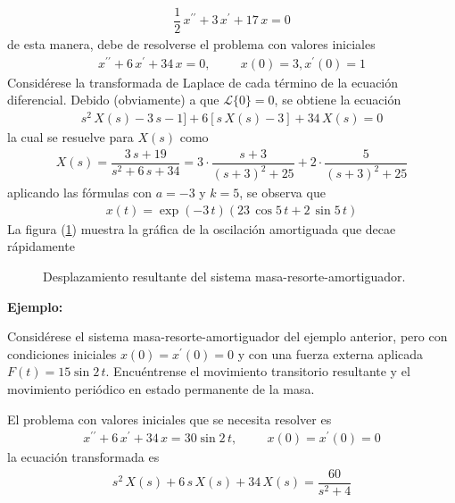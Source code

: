 \begin{align*}
\dfrac{1}{2} \, x^{\prime \prime} + 3 \, x^{\prime} + 17 \, x = 0
\end{align*}
de esta manera, debe de resolverse el problema con valores iniciales
\begin{align*}
x^{\prime \prime} + 6 \, x^{\prime} + 34 \, x = 0, \hspace{1cm} x(0) = 3, x^{\prime}(0) = 1
\end{align*}
Considérese la transformada de Laplace de cada término de la ecuación diferencial. Debido (obviamente) a que $\mathscr{L} \{ 0 \} = 0 $, se obtiene la ecuación
\begin{align*}
s^{2} \, X(s) - 3 \, s - 1] + 6 [s \, X(s) - 3] +  34 \, X(s) = 0
\end{align*}
la cual se resuelve para $X(s)$ como
\begin{align*}
X(s) = \dfrac{3 \, s + 19}{s^{2} + 6 \, s + 34} =  3 \cdot \dfrac{s + 3}{(s+3)^{2} + 25} + 2 \cdot \dfrac{5}{(s+3)^{2} + 25}
\end{align*}
aplicando las fórmulas con $a = -3$ y $k = 5$, se observa que
\begin{align*}
x(t) = \exp(-3 \, t) (23 \, \cos 5 \, t  + 2 \, \sin 5 \, t)
\end{align*}
La figura (\ref{fig:figura_07_03_02}) muestra la gráfica de la oscilación amortiguada que decae rápidamente
\begin{figure}[H]
    \centering
    
    \caption{Desplazamiento resultante del sistema masa-resorte-amortiguador.}
    \label{fig:figura_07_03_02}
\end{figure}
\textbf{Ejemplo:}
\par
Considérese el sistema masa-resorte-amortiguador del ejemplo anterior, pero con condiciones iniciales $x(0) = x^{\prime}(0) = 0$ y con una fuerza externa aplicada $F(t) = 15 \sin 2 \, t$. Encuéntrense el movimiento transitorio resultante y el movimiento periódico en estado permanente de la masa.
\par
El problema con valores iniciales que se necesita resolver es
\begin{align*}
x^{\prime \prime} + 6 \, x^{\prime} + 34 \, x =  30  \sin 2 \, t, \hspace{1cm} x(0) = x^{\prime}(0) = 0
\end{align*}
la ecuación transformada es
\begin{align*}
s^{2} \, X(s) + 6 \, s \, X(s) + 34 \, X(s) = \dfrac{60}{s^{2} + 4}
\end{align*}
